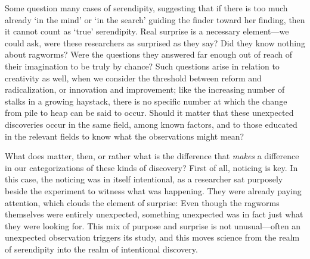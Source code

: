 \documentclass[authordate, commentary]{jote-new-article}
\begin{document}

	Some question many cases of serendipity, suggesting that if there is too much already ‘in the mind' or ‘in the search' guiding the finder toward her finding, then it cannot count as ‘true' serendipity. Real surprise is a necessary element—we could ask, were these researchers as surprised as they say? Did they know nothing about ragworms? Were the questions they answered far enough out of reach of their imagination to be truly by chance? Such questions arise in relation to creativity as well, when we consider the threshold between reform and radicalization, or innovation and improvement; like the increasing number of stalks in a growing haystack, there is no specific number at which the change from pile to heap can be said to occur. Should it matter that these unexpected discoveries occur in the same field, among known factors, and to those educated in the relevant fields to know what the observations might mean?



	What does matter, then, or rather what is the difference that \emph{makes} a difference in our categorizations of these kinds of discovery? First of all, noticing is key. In this case, the noticing was in itself intentional, as a researcher sat purposely beside the experiment to witness what was happening. They were already paying attention, which clouds the element of surprise: Even though the ragworms themselves were entirely unexpected, something unexpected was in fact just what they were looking for. This mix of purpose and surprise is not unusual—often an unexpected observation triggers its study, and this moves science from the realm of serendipity into the realm of intentional discovery.
\end{document}

